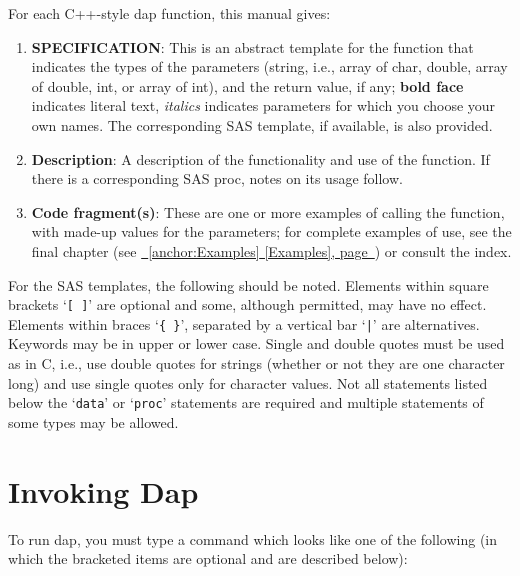 \documentclass{book}
\newcommand\Texinfocommandstyletextvar[1]{{\normalfont{}\textsl{#1}}}%
\renewcommand{\_}{\Texinfounderscore\discretionary{}{}{}}
\begin{document}
For each C++-style dap function, this manual
%
%
gives:

\begin{enumerate}[start=1]
\item \textbf{SPECIFICATION}: This is an abstract template for the function that indicates the
types of the parameters (string,
%
%
%
i.e., array of char, double, array of double, int,
or array of int), and the return value, if any; \textbf{bold face} indicates
literal text, \Texinfocommandstyletextvar{italics} indicates parameters for which you choose your own
names. The corresponding SAS template, if available, is also provided.

\item \textbf{Description}: A description of the functionality and use of the function.
If there is a corresponding SAS proc, notes on its usage follow.

\item \textbf{Code fragment(s)}: These are one or more examples of calling the function, with made-up values
for the parameters; for complete examples of use, see the final chapter
(see \hyperref[anchor:Examples]{\chaptername~\ref*{anchor:Examples} [Examples], page~\pageref*{anchor:Examples}}) or consult the index.  
\end{enumerate}

%
For the SAS templates, the following should be noted.
Elements within square brackets `\texttt{[ ]}' are optional and
some, although permitted, may have no effect.
Elements within braces `\texttt{\{\ \}}', separated by a vertical bar `\texttt{|}' are
alternatives.
Keywords may be in upper or lower case.
Single and double quotes must be used as in C, i.e., use double quotes
for strings (whether or not they are one character long) and
use single quotes only for character values.
Not all statements listed below the `\texttt{data}' or `\texttt{proc}'
statements are required and multiple statements of some types may be allowed.

\section{{Invoking Dap}}
\label{anchor:Invoking-Dap}%
%
%

To run dap, you must type a command which looks like one of the following
(in which the bracketed items are optional and are described below):
\end{document}
